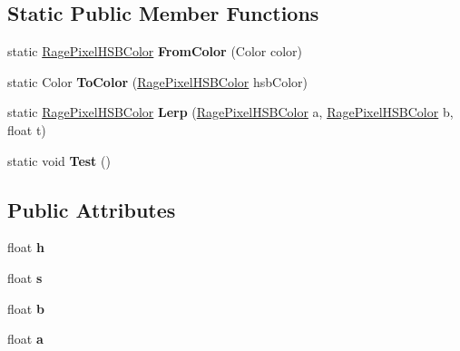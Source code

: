 \subsection*{Static Public Member Functions}
\begin{DoxyCompactItemize}
\item 
\hypertarget{struct_rage_pixel_h_s_b_color_ae1b541ac9896d929ba1b2f682d03ef42}{static \hyperlink{struct_rage_pixel_h_s_b_color}{Rage\-Pixel\-H\-S\-B\-Color} {\bfseries From\-Color} (Color color)}\label{struct_rage_pixel_h_s_b_color_ae1b541ac9896d929ba1b2f682d03ef42}

\item 
\hypertarget{struct_rage_pixel_h_s_b_color_a193778718d52d39ff556379ffb6d3fd5}{static Color {\bfseries To\-Color} (\hyperlink{struct_rage_pixel_h_s_b_color}{Rage\-Pixel\-H\-S\-B\-Color} hsb\-Color)}\label{struct_rage_pixel_h_s_b_color_a193778718d52d39ff556379ffb6d3fd5}

\item 
\hypertarget{struct_rage_pixel_h_s_b_color_accdba94fe9a06b30e6beab1f4b51b33f}{static \hyperlink{struct_rage_pixel_h_s_b_color}{Rage\-Pixel\-H\-S\-B\-Color} {\bfseries Lerp} (\hyperlink{struct_rage_pixel_h_s_b_color}{Rage\-Pixel\-H\-S\-B\-Color} a, \hyperlink{struct_rage_pixel_h_s_b_color}{Rage\-Pixel\-H\-S\-B\-Color} b, float t)}\label{struct_rage_pixel_h_s_b_color_accdba94fe9a06b30e6beab1f4b51b33f}

\item 
\hypertarget{struct_rage_pixel_h_s_b_color_a138ef56d3387027cb1bf255e4acc4db0}{static void {\bfseries Test} ()}\label{struct_rage_pixel_h_s_b_color_a138ef56d3387027cb1bf255e4acc4db0}

\end{DoxyCompactItemize}
\subsection*{Public Attributes}
\begin{DoxyCompactItemize}
\item 
\hypertarget{struct_rage_pixel_h_s_b_color_aa5918d2dc2ce0cfe52b1a318b806fb35}{float {\bfseries h}}\label{struct_rage_pixel_h_s_b_color_aa5918d2dc2ce0cfe52b1a318b806fb35}

\item 
\hypertarget{struct_rage_pixel_h_s_b_color_a7cd56ff7d3a0354ff48cda6d9b06ea7c}{float {\bfseries s}}\label{struct_rage_pixel_h_s_b_color_a7cd56ff7d3a0354ff48cda6d9b06ea7c}

\item 
\hypertarget{struct_rage_pixel_h_s_b_color_a0f81338d5c5371f7e0e31815df219d21}{float {\bfseries b}}\label{struct_rage_pixel_h_s_b_color_a0f81338d5c5371f7e0e31815df219d21}

\item 
\hypertarget{struct_rage_pixel_h_s_b_color_ac1457d1f77222b5b65ab00d4b2aeb7a1}{float {\bfseries a}}\label{struct_rage_pixel_h_s_b_color_ac1457d1f77222b5b65ab00d4b2aeb7a1}

\end{DoxyCompactItemize}


